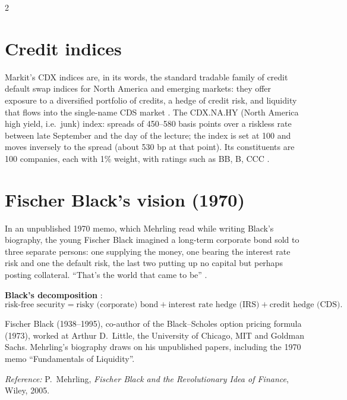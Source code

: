 \begin{paracol}{2}
\section{Credit indices}\label{sec:cds-index}

\begin{finance}
Markit's CDX indices are, in its words, the standard tradable family of credit default swap indices for North America and emerging markets: they offer exposure to
a diversified portfolio of credits, a hedge of credit risk, and liquidity that flows into the single-name CDS market .
The CDX.NA.HY (North America high yield, i.e.\ junk) index: spreads of 450--580 basis points over a riskless rate between late September and the day of the lecture;
the index is set at 100 and moves inversely to the spread (about 530 bp at that point). Its constituents are 100 companies, each with 1\% weight, with ratings
such as BB, B, CCC .
\end{finance}

\section{Fischer Black's vision (1970)}\label{sec:cds-black}

In an unpublished 1970 memo, which Mehrling read while writing Black's biography, the young Fischer Black imagined a long-term corporate bond sold to three
separate persons: one supplying the money, one bearing the interest rate risk and one the default risk, the last two putting up no capital but perhaps posting
collateral. ``That's the world that came to be'' .

\begin{keyformulas}
\textbf{Black's decomposition} :
\[
  \text{risk-free security} = \text{risky (corporate) bond} + \text{interest rate hedge (IRS)} + \text{credit hedge (CDS)}.
\]
\end{keyformulas}

\begin{history}
Fischer Black (1938--1995), co-author of the Black--Scholes option pricing formula (1973), worked at Arthur D.~Little, the University of Chicago, MIT and Goldman
Sachs. Mehrling's biography draws on his unpublished papers, including the 1970 memo ``Fundamentals of Liquidity''.\par
\emph{Reference:} P.~Mehrling, \emph{Fischer Black and the Revolutionary Idea of Finance}, Wiley, 2005.
\end{history}


\end{paracol}
